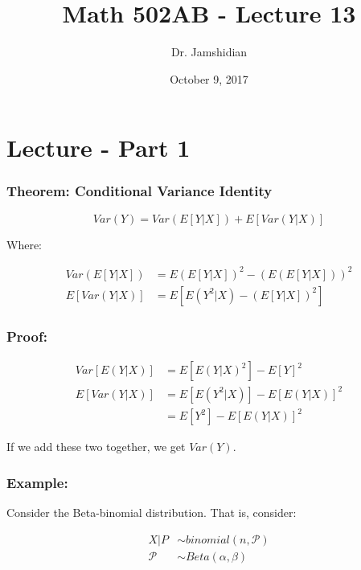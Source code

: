\documentclass{article}
\title{Math 502AB - Lecture 13}
\author{Dr. Jamshidian}
\date{October 9, 2017}
\begin{document}
\maketitle

\section{Lecture - Part 1}

\subsubsection{Theorem: Conditional Variance Identity}

\begin{equation*}
    Var(Y) = Var(E[Y|X]) + E[Var(Y|X)]
\end{equation*}

Where:

\begin{equation*}
\begin{split}
    Var(E[Y|X]) &= E\left(E[Y|X] \right)^2 - \left(E(E[Y|X])\right)^2\\
    E[Var(Y|X)] &= E\left[E(Y^2|X) - (E[Y|X])^2 \right]
\end{split}
\end{equation*}


\subsubsection*{Proof:}

\begin{equation*}
\begin{split}
    Var[E(Y|X)] &= E[E(Y|X)^2] - E[Y]^2\\
    E[Var(Y|X)] &= E[E(Y^2|X)] - E[E(Y|X)]^2\\
                &= E[Y^2] - E[E(Y|X)]^2
\end{split}
\end{equation*}

If we add these two together, we get $Var(Y)$.


\subsubsection*{Example:}

Consider the Beta-binomial distribution. That is, consider:

\begin{equation*}
    \begin{split}
        X|P &\sim binomial(n,\mathcal{P})\\
        \mathcal{P} &\sim Beta(\alpha,\beta)
    \end{split}
\end{equation*}
\end{document}
